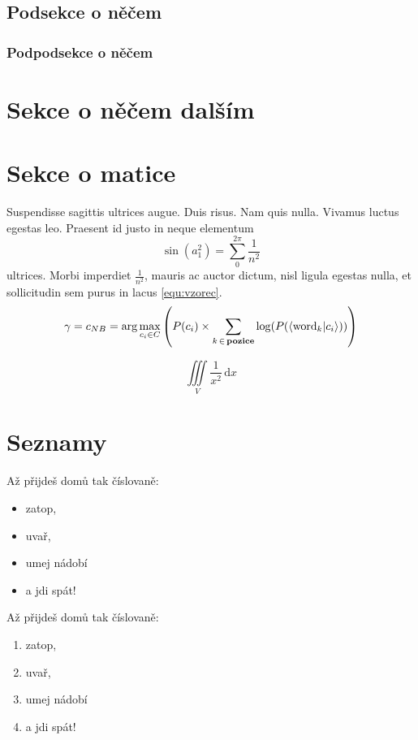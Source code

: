 \documentclass[12pt, a4paper]{report}
\begin{document}
\subsection{Podsekce o něčem}

\subsubsection{Podpodsekce o něčem}

\section{Sekce o něčem dalším}

\section{Sekce o matice}
Suspendisse sagittis ultrices augue. Duis risus. Nam quis nulla. Vivamus luctus egestas leo. Praesent id justo in neque
elementum $$\sin(a_{1}^2) = \sum_{0}^{2\pi}\frac{1}{n^2}$$ ultrices. Morbi imperdiet $\frac{1}{n^2}$, mauris ac auctor
dictum, nisl ligula egestas nulla, et sollicitudin sem purus in lacus \ref{equ:vzorec}.
\begin{equation}
    \gamma = c_{NB} = \arg\max_{c_i \in C}\left( P(c_i) \times \sum_{k\,\in\,\text{\bfseries pozice}}
        \log (P(\langle\text{word}_k | c_i \rangle))\right)
    \label{equ:vzorec}
\end{equation}

\begin{equation*}
    \iiint\limits_{V} \frac{1}{x^2}\,\mathrm{d}x
\end{equation*}

\section{Seznamy}
Až přijdeš domů tak číslovaně:
\begin{itemize}
    \item zatop,
    \item uvař,
    \item umej nádobí
    \item a jdi spát!
\end{itemize}

Až přijdeš domů tak číslovaně:
\begin{enumerate}
    \item zatop,
    \item uvař,
    \item umej nádobí
    \item a jdi spát! 
\end{enumerate}
\end{document}
